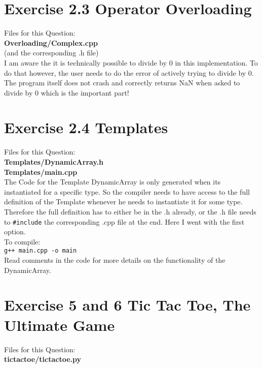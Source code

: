 \documentclass{article} %
\newcommand{\homeworkNumber}{2} %
\begin{document}
\clearpage
\section*{Exercise \homeworkNumber.3 Operator Overloading}
Files for this Question:\\
\textbf{Overloading/Complex.cpp}\\
(and the corresponding .h file)\\

I am aware the it is technically possible to divide by 0 in this implementation. To do that however, the user needs to do the error of actively trying to divide by 0. The program itself does not crash and correctly returns NaN when asked to divide by 0 which is the important part!
%
\clearpage

\section*{Exercise \homeworkNumber.4 Templates}
Files for this Question:\\
\textbf{Templates/DynamicArray.h}\\
\textbf{Templates/main.cpp}\\

The Code for the Template DynamicArray is only generated when its instantiated for a specific type. So the compiler needs to have access to the full definition of the Template whenever he needs to instantiate it for some type. Therefore the full definition has to either be in the .h already, or the .h file needs to \verb|#include| the corresponding .cpp file at the end. Here I went with the first option.\\

To compile:\\
\verb|g++ main.cpp -o main|\\

Read comments in the code for more details on the functionality of the DynamicArray.
%
\clearpage

\section*{Exercise 5 and 6 Tic Tac Toe, The Ultimate Game}
Files for this Question:\\
\textbf{tictactoe/tictactoe.py}\\
\end{document}
